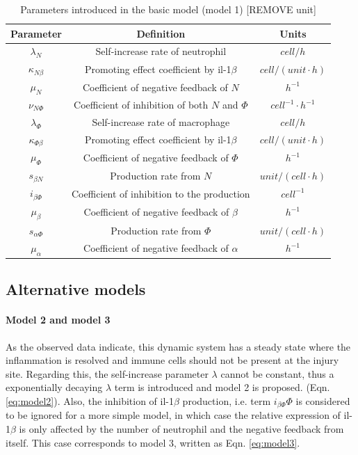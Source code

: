 \documentclass[12pt,a4paper]{report}
\begin{document}
\begin{table}[h!]
\centering
\begin{tabular}{|c c c|} 
 \hline
 Parameter & Definition & Units\\ [0.5ex] 
 \hline\hline
 $\lambda_N$ & Self-increase rate of neutrophil & $cell/h$  \\ 
 $\kappa_{N\beta}$ & Promoting effect coefficient by il-1$\beta$ & $cell/(unit\cdotp h)$\\
 $\mu_N$ & Coefficient of negative feedback of $N$ & $h^{-1}$ \\
 $\nu_{N\Phi}$ & Coefficient of inhibition of both $N$ and $\Phi$& $cell^{-1}\cdotp h^{-1}$ \\
 \hline
 $\lambda_\Phi$ & Self-increase rate of macrophage & $cell/h$ \\
 $\kappa_{\Phi\beta}$ & Promoting effect coefficient by il-1$\beta$ & $cell/(unit\cdotp h)$ \\
 $\mu_\Phi$ &  Coefficient of negative feedback of $\Phi$ & $h^{-1}$ \\
 \hline
 $s_{\beta N}$ & Production rate from $N$ & $unit/(cell\cdotp h)$ \\
 $i_{\beta\Phi}$ & Coefficient of inhibition to the production & $cell^{-1}$ \\
 $\mu_\beta$ & Coefficient of negative feedback of $\beta$ & $h^{-1}$ \\
 \hline
 $s_{\alpha\Phi}$ & Production rate from $\Phi$ & $unit/(cell\cdotp h)$ \\
 $\mu_\alpha$ & Coefficient of negative feedback of $\alpha$ & $h^{-1}$ \\
 \hline
\end{tabular}
\caption{Parameters introduced in the basic model (model 1) [REMOVE unit]}
\label{table:m1}
\end{table}

\subsection{Alternative models}

\paragraph{Model 2 and model 3}

As the observed data indicate, this dynamic system has a steady state where the  inflammation is resolved and immune cells should not be present at the injury site. Regarding this, the self-increase parameter $\lambda$ cannot be constant, thus a exponentially decaying $\lambda$ term is introduced and model 2 is proposed. (Eqn. \ref{eq:model2}). Also, the inhibition of il-1$\beta$ production, i.e. term $i_{\beta\Phi}\Phi$ is considered to be ignored for a more simple model, in which case the relative expression of il-1$\beta$ is only affected by the number of neutrophil and the negative feedback from itself. This case corresponds to model 3, written as Eqn. \ref{eq:model3}.
\end{document}
